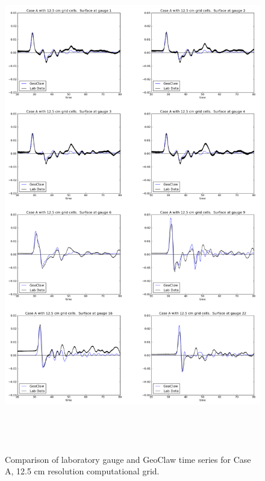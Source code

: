 \begin{figure}[ht]
\hfil\includegraphics[height=8.5in]{bp6/A12-5Gages.png}\hfil
\caption{\label{A12-5Gages}
Comparison of laboratory gauge and GeoClaw time series for Case A, 12.5 cm resolution computational grid.
  }
\end{figure}

